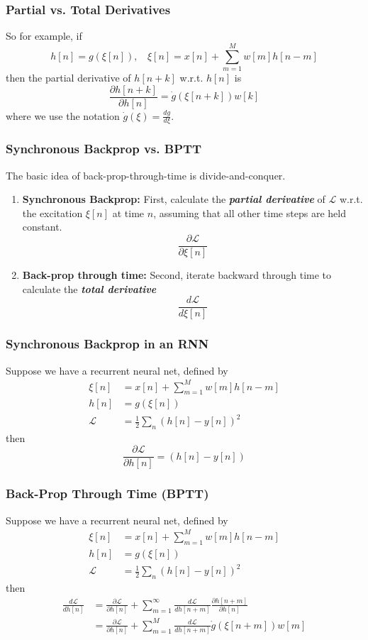 \documentclass{beamer}
\begin{document}
\begin{frame}
  \frametitle{Partial vs. Total Derivatives}

  So for example, if
  \[
  h[n] =g(\xi[n]),~~~~\xi[n]=x[n]+\sum_{m=1}^{M}w[m]h[n-m]
  \]
  then the partial derivative of $h[n+k]$ w.r.t. $h[n]$ is 
  \[
  \frac{\partial h[n+k]}{\partial h[n]}= \dot{g}(\xi[n+k]) w[k] 
  \]
  where we use the notation $\dot{g}(\xi)=\frac{dg}{d\xi}$.
\end{frame}

\begin{frame}
  \frametitle{Synchronous Backprop vs. BPTT}

  The basic idea of back-prop-through-time is divide-and-conquer.
  \begin{enumerate}
    \item {\bf Synchronous Backprop:} First, calculate the {\bf\em
      partial derivative} of ${\mathcal L}$ w.r.t. the excitation $\xi[n]$ at time
      $n$, assuming that all other time steps are held constant.
      \[
      \frac{\partial {\mathcal L}}{\partial\xi[n]}
      \]
    \item {\bf Back-prop through time:} Second, iterate backward
      through time to calculate the {\bf\em total derivative}
      \[
      \frac{d{\mathcal L}}{d\xi[n]}
      \]
  \end{enumerate}
\end{frame}

\begin{frame}
  \frametitle{Synchronous Backprop in an RNN}
  Suppose we have a recurrent neural net, defined by
  \begin{align*}
    \xi[n] &= x[n] + \sum_{m=1}^{M}w[m] h[n-m]\\
    h[n] &= g\left(\xi[n]\right)\\
    {\mathcal L} &= \frac{1}{2}\sum_n\left(h[n]-y[n]\right)^2
  \end{align*}
  then
  \[
  \frac{\partial {\mathcal L}}{\partial h[n]} = \left(h[n]-y[n]\right)
  \]
\end{frame}

  
\begin{frame}
  \frametitle{Back-Prop Through Time (BPTT)}
  Suppose we have a recurrent neural net, defined by
  \begin{align*}
    \xi[n] &= x[n] + \sum_{m=1}^{M}w[m] h[n-m]\\
    h[n] &= g\left(\xi[n]\right)\\
    {\mathcal L} &= \frac{1}{2}\sum_n\left(h[n]-y[n]\right)^2
  \end{align*}
  then
  \begin{align*}
    \frac{d{\mathcal L}}{d h[n]}
    &=\frac{\partial {\mathcal L}}{\partial h[n]}+
    \sum_{m=1}^{\infty}\frac{d{\mathcal L}}{d h[n+m]}\frac{\partial h[n+m]}{\partial h[n]}\\
    &=\frac{\partial {\mathcal L}}{\partial h[n]}+
    \sum_{m=1}^{M}\frac{d{\mathcal L}}{dh[n+m]}\dot{g}(\xi[n+m]) w[m]
  \end{align*}
\end{frame}
  
\end{document}
